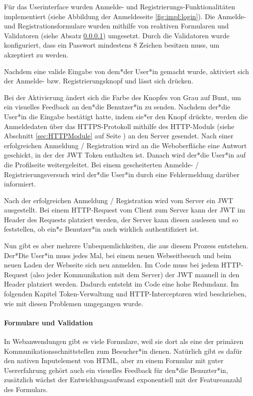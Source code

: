 Für das Userinterface wurden Anmelde- und Registrierungs-Funktionalitäten implementiert (siehe Abbildung der Anmeldeseite \ref{fig:impl:login}). Die Anmelde- und Registrationsformulare wurden mithilfe von reaktiven Formularen und Validatoren (siehe Absatz \ref{par:impl:usermanagment:reactiveForms}) umgesetzt.
Durch die Validatoren wurde konfiguriert, dass ein Passwort mindestens 8 Zeichen besitzen muss, um akzeptiert zu werden.

Nachdem eine valide Eingabe von dem*der User*in gemacht wurde, aktiviert sich der Anmelde- bzw. Registrierungsknopf und lässt sich drücken.

Bei der Aktivierung ändert sich die Farbe des Knopfes von Grau auf Bunt, um ein visuelles Feedback an den*die Benutzer*in zu senden. Nachdem der*die User*in die Eingabe bestätigt hatte, indem sie*er den Knopf drückte, werden die Anmeldedaten über das HTTPS-Protokoll mithilfe des HTTP-Moduls (siehe Abschnitt \ref{sec:HTTPModule} auf Seite \pageref{sec:HTTPModule}) an den Server gesendet. Nach einer erfolgreichen Anmeldung / Registration wird an die Weboberfläche eine Antwort geschickt, in der der JWT Token enthalten ist. Danach wird der*die User*in auf die Profilseite weitergeleitet. Bei einem gescheiterten Anmelde- / Registrierungsversuch wird der*die User*in durch eine Fehlermeldung darüber informiert.

Nach der erfolgreichen Anmeldung / Registration wird vom Server ein JWT ausgestellt. Bei einem HTTP-Request vom Client zum Server kann der JWT im Header des Requests platziert werden, der Server kann diesen auslesen und so feststellen, ob ein*e Benutzer*in auch wirklich authentifiziert ist.

Nun gibt es aber mehrere Unbequemlichkeiten, die aus diesem Prozess entstehen. Der*Die User*in muss jedes Mal, bei einem neuen Webseitbesuch und beim neuen Laden der Webseite sich neu anmelden. Im Code muss bei jedem HTTP-Request (also jeder Kommunikation mit dem Server) der JWT manuell in den Header platziert werden. Dadurch entsteht im Code eine hohe Redundanz. Im folgenden Kapitel Token-Verwaltung und HTTP-Interceptoren wird beschrieben, wie mit diesen Problemen umgegangen wurde.

\paragraph{Formulare und Validation}
\label{par:impl:usermanagment:reactiveForms}
In Webanwendungen gibt es viele Formulare, weil sie dort als eine der primären Kommunikationsschnittstellen zum Besucher*in dienen. Natürlich gibt es dafür den nativen Inputelement von HTML, aber zu einem Formular mit guter Usererfahrung gehört auch ein visuelles Feedback für den*die Benuzter*in, zusätzlich wächst der Entwicklungsaufwand exponentiell mit der Featureanzahl des Formulars.

